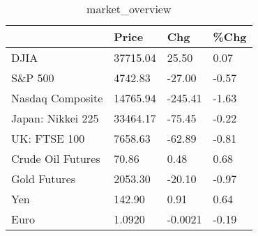 \documentclass{article}%
\begin{document}
%


\begin{table}[htbp]%
\caption{market\_overview}%
\centering%
\begin{adjustbox}{width=1\textwidth}%
\begin{tabular}{llll}
\toprule
                  &    Price &     Chg &  \%Chg \\
\midrule
             DJIA & 37715.04 &   25.50 &  0.07 \\
          S\&P 500 &  4742.83 &  -27.00 & -0.57 \\
 Nasdaq Composite & 14765.94 & -245.41 & -1.63 \\
Japan: Nikkei 225 & 33464.17 &  -75.45 & -0.22 \\
     UK: FTSE 100 &  7658.63 &  -62.89 & -0.81 \\
Crude Oil Futures &    70.86 &    0.48 &  0.68 \\
     Gold Futures &  2053.30 &  -20.10 & -0.97 \\
              Yen &   142.90 &    0.91 &  0.64 \\
             Euro &   1.0920 & -0.0021 & -0.19 \\
\bottomrule
\end{tabular}
%
\end{adjustbox}%
\end{table}

%
\end{document}
